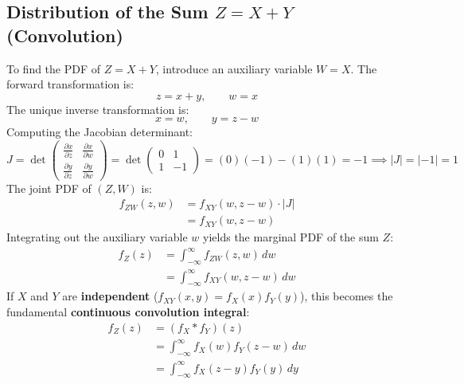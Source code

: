\documentclass[12pt,a4paper]{article}
\begin{document}
\subsection{Distribution of the Sum $Z = X + Y$ (Convolution)}
\begin{tcolorbox}[examplebox, title={\textbf{Derivation: PDF of the Sum of Two Continuous Random Variables}}]
To find the PDF of $Z = X + Y$, introduce an auxiliary variable $W = X$.
The forward transformation is:
\begin{equation}
  z = x + y, \qquad w = x
\end{equation}
The unique inverse transformation is:
\begin{equation}
  x = w, \qquad y = z - w
\end{equation}
Computing the Jacobian determinant:
\begin{equation}
  J = \det \begin{pmatrix} \frac{\partial x}{\partial z} & \frac{\partial x}{\partial w} \\[4pt] \frac{\partial y}{\partial z} & \frac{\partial y}{\partial w} \end{pmatrix} = \det \begin{pmatrix} 0 & 1 \\ 1 & -1 \end{pmatrix} = (0)(-1) - (1)(1) = -1 \implies |J| = |-1| = 1
\end{equation}
The joint PDF of $(Z, W)$ is:
\begin{equation}
  \begin{aligned}
    f_{ZW}(z, w) &= f_{XY}(w, z - w) \cdot |J| \\[3pt]
    &= f_{XY}(w, z - w)
  \end{aligned}
\end{equation}
Integrating out the auxiliary variable $w$ yields the marginal PDF of the sum $Z$:
\begin{equation}
  \begin{aligned}
    f_Z(z) &= \int_{-\infty}^\infty f_{ZW}(z, w) \, dw \\[3pt]
    &= \int_{-\infty}^\infty f_{XY}(w, z - w) \, dw
  \end{aligned}
\end{equation}
If $X$ and $Y$ are \textbf{independent} ($f_{XY}(x, y) = f_X(x) f_Y(y)$), this becomes the fundamental \textbf{continuous convolution integral}:
\begin{equation}
  \begin{aligned}
    f_Z(z) &= (f_X * f_Y)(z) \\[3pt]
    &= \int_{-\infty}^\infty f_X(w) f_Y(z - w) \, dw \\[3pt]
    &= \int_{-\infty}^\infty f_X(z - y) f_Y(y) \, dy
  \end{aligned}
\end{equation}
\end{tcolorbox}
\end{document}
